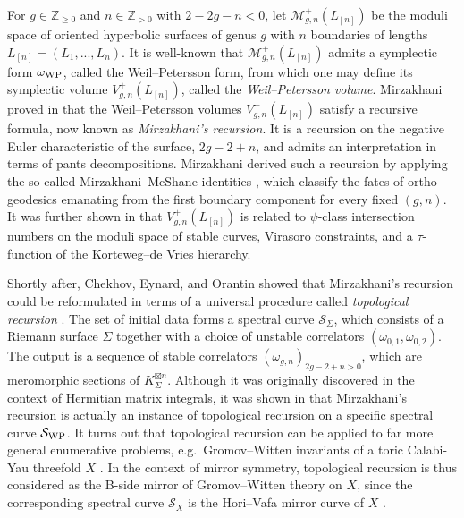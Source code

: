 \documentclass[12pt]{amsart}
\theoremstyle{plain}
\theoremstyle{definition}
\theoremstyle{remark}
\numberwithin{equation}{section}
\begin{document}
For $g\in\mathbb{Z}_{\geq0}$ and $n\in\mathbb{Z}_{>0}$ with $2-2g-n<0$, let $\mathcal{M}^+_{g,n}(L_{[n]})$ be the moduli space of oriented hyperbolic surfaces of genus $g$ with $n$ boundaries of lengths $L_{[n]}=(L_1,...,L_n)$. It is well-known that $\mathcal{M}^+_{g,n}(L_{[n]})$ admits a symplectic form $\omega_{{\rm WP}}$, called the Weil--Petersson form, from which one may define its symplectic volume $V^+_{g,n}(L_{[n]})$, called the \emph{Weil--Petersson volume}. Mirzakhani proved in \cite{Mir06} that the Weil--Petersson volumes $V^+_{g,n}(L_{[n]})$ satisfy a recursive formula, now known as \emph{Mirzakhani's recursion}. It is a recursion on the negative Euler characteristic of the surface, $2g-2+n$, and admits an interpretation in terms of pants decompositions. Mirzakhani derived such a recursion by applying the so-called Mirzakhani--McShane identities \cite{McS98,Mir06}, which classify the fates of ortho-geodesics emanating from the first boundary component for every fixed $(g,n)$. It was further shown in \cite{Mir07,MS08} that $V^+_{g,n}(L_{[n]})$ is related to $\psi$-class intersection numbers on the moduli space of stable curves, Virasoro constraints, and a $\tau$-function of the Korteweg--de Vries hierarchy.  

Shortly after, Chekhov, Eynard, and Orantin showed that Mirzakhani's recursion could be reformulated in terms of a universal procedure called \emph{topological recursion} \cite{CE05,EO07}.
The set of initial data forms a spectral curve $\mathcal{S}_\Sigma$, which consists of a Riemann surface $\Sigma$ together with a choice of unstable correlators $(\omega_{0,1},\omega_{0,2})$. The output is a sequence of stable correlators $(\omega_{g,n})_{2g-2+n>0}$, which are meromorphic sections of $K_\Sigma^{\boxtimes n}$. Although it was originally discovered in the context of Hermitian matrix integrals, it was shown in \cite{EO08} that Mirzakhani's recursion is actually an instance of topological recursion on a specific spectral curve $\mathcal{S}_{\rm WP}$.  It turns out that topological recursion can be applied to far more general enumerative problems, e.g.~Gromov--Witten invariants of a toric Calabi-Yau threefold $X$ \cite{BKMP08,FLZ16}. In the context of mirror symmetry, topological recursion is thus considered as the B-side mirror of Gromov--Witten theory on $X$, since the corresponding spectral curve $\mathcal{S}_X$ is the Hori--Vafa mirror curve of $X$ \cite{HV00}.
\end{document}
